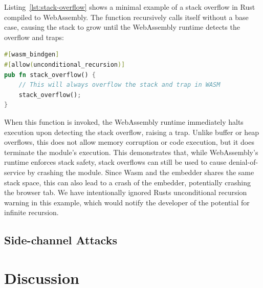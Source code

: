 \documentclass{article}
\begin{document}
Listing~\ref{lst:stack-overflow} shows a minimal example of a stack overflow in Rust compiled to WebAssembly. The function recursively calls itself without a base case, causing the stack to grow until the WebAssembly runtime detects the overflow and traps:

\begin{lstlisting}[language=rust, float, caption={Stack overflow via infinite recursion in Rust}, label={lst:stack-overflow}]
#[wasm_bindgen]
#[allow(unconditional_recursion)]
pub fn stack_overflow() {
    // This will always overflow the stack and trap in WASM
    stack_overflow(); 
}
\end{lstlisting}

When this function is invoked, the WebAssembly runtime immediately halts execution upon detecting the stack overflow, raising a trap. Unlike buffer or heap overflows, this does not allow memory corruption or code execution, but it does terminate the module's execution. This demonstrates that, while WebAssembly's runtime enforces stack safety, stack overflows can still be used to cause denial-of-service by crashing the module. Since Wasm and the embedder shares the same stack space, this can also lead to a crash of the embedder, potentially crashing the browser tab. We have intentionally ignored Rusts unconditional recursion warning in this example, which would notify the developer of the potential for infinite recursion. 

\subsection{Side-channel Attacks}


\section{Discussion}


\newpage
\nocite{*}
\printbibliography[title=References]
\end{document}
